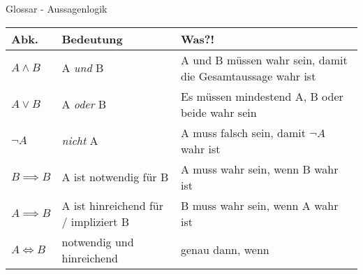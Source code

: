 \begin{frame}[fragile]{Glossar - Aussagenlogik}
    \small
    \begin{tabular}{p{} p{} p{}}
        \toprule
        Abk.           & Bedeutung                            & Was?!                                                      \\
        \midrule
        $A\land B$     & A \textit{und} B                     & A und B müssen wahr sein, damit die Gesamtaussage wahr ist \\
        $A\lor B$      & A \textit{oder} B                    & Es müssen mindestend A, B oder beide wahr sein             \\
        $\lnot A$      & \textit{nicht} A                     & A muss falsch sein, damit $\lnot A$ wahr ist               \\
        $B \implies B$ & A ist notwendig für B                & A muss wahr sein, wenn B wahr ist                          \\
        $A \implies B$ & A ist hinreichend für / impliziert B & B muss wahr sein, wenn A wahr ist                          \\
        $A \iff B$     & notwendig und hinreichend            & genau dann, wenn                                           \\
        \bottomrule
    \end{tabular}
\end{frame}